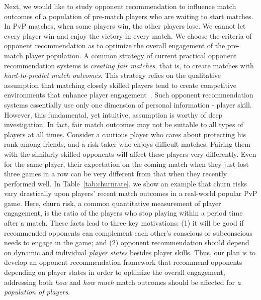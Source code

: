 Next, we would like to study opponent recommendation to influence match outcomes of a population of pre-match players who are waiting to start matches. In PvP matches, when some players win, the other players lose. We cannot let every player win and enjoy the victory in every match. We choose the criteria of opponent recommendation as to optimize the overall engagement of the pre-match player population. A common strategy of current practical opponent recommendation systems is \textit{creating fair matches}, that is, to create matches with \textit{hard-to-predict match outcomes}. This strategy relies on the qualitative assumption that matching closely skilled players tend to create competitive environments that enhance player engagement~\cite{sweetser2005gameflow,flow1990psychology,chen2007flow,graepel2006ranking}. Such opponent recommendation systems essentially use only one dimension of personal information - player skill. However, this fundamental, yet intuitive, assumption is worthy of deep investigation. In fact, fair match outcomes may not be suitable to all types of players at all times. Consider a cautious player who cares about protecting his rank among friends, and a risk taker who enjoys difficult matches. Pairing them with the similarly skilled opponents will affect these players very differently. Even for the same player, their expectation on the coming match when they just lost three games in a row can be very different from that when they recently performed well. In Table~\ref{tab:churnrate}, we show an example that churn risks vary drastically upon players' recent match outcomes in a real-world popular PvP game. Here, churn risk, a common quantitative measurement of player engagement, is the ratio of the players who stop playing within a period time after a match. These facts lead to three key motivations: (1) it will be good if recommended opponents can complement each other's conscious or subconscious needs to engage in the game; and (2) opponent recommendation should depend on dynamic and individual \emph{player states} besides player skills. Thus, our plan is to develop an opponent recommendation framework that recommend opponents depending on player states in order to optimize the overall engagement, addressing both \textit{how} and \textit{how much} match outcomes should be affected for \textit{a population of players}.



